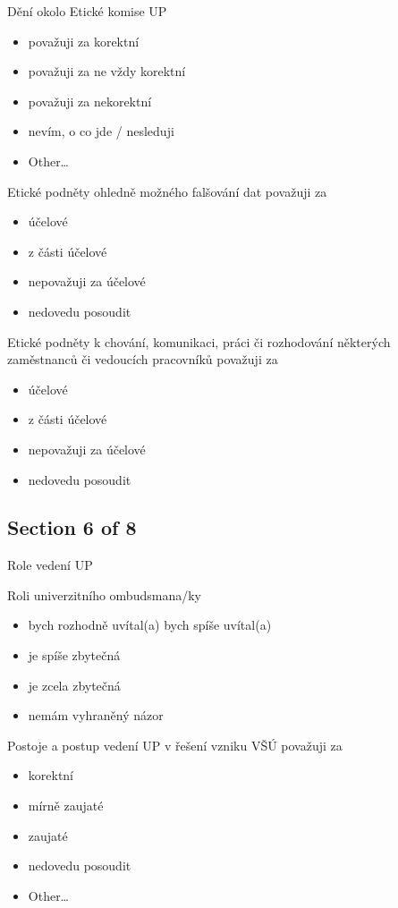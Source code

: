 Dění okolo Etické komise UP
\begin{itemize}
      \item považuji za korektní
      \item považuji za ne vždy korektní
      \item považuji za nekorektní
      \item nevím, o co jde / nesleduji
      \item Other…
\end{itemize}

Etické podněty ohledně možného falšování dat považuji za
\begin{itemize}
      \item účelové
      \item z části účelové
      \item nepovažuji za účelové
      \item nedovedu posoudit
\end{itemize}

Etické podněty k chování, komunikaci, práci či rozhodování některých zaměstnanců či vedoucích pracovníků považuji za
\begin{itemize}
      \item účelové
      \item z části účelové
      \item nepovažuji za účelové
      \item nedovedu posoudit
\end{itemize}

\subsection{Section 6 of 8}
Role vedení UP

\bigskip
Roli univerzitního ombudsmana/ky
\begin{itemize}
      \item bych rozhodně uvítal(a)
bych spíše uvítal(a)
      \item je spíše zbytečná
      \item je zcela zbytečná
      \item nemám vyhraněný názor
\end{itemize}

Postoje a postup vedení UP v řešení vzniku VŠÚ považuji za
\begin{itemize}
      \item korektní
      \item mírně zaujaté
      \item zaujaté
      \item nedovedu posoudit
      \item Other…
\end{itemize}

